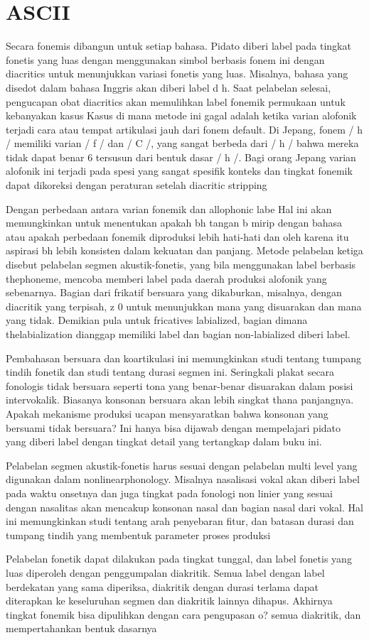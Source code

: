 \section{ASCII}
Secara fonemis dibangun untuk setiap bahasa.
Pidato diberi label pada tingkat fonetis yang luas dengan menggunakan simbol berbasis fonem ini dengan diacritics
untuk menunjukkan variasi fonetis yang luas. Misalnya, bahasa yang disedot dalam bahasa Inggris akan diberi label d h.
Saat pelabelan selesai, pengucapan obat diacritics akan memulihkan label fonemik permukaan
untuk kebanyakan kasus Kasus di mana metode ini gagal adalah ketika varian alofonik terjadi
cara atau tempat artikulasi jauh dari fonem default. Di Jepang, fonem / h /
memiliki varian / f / dan / C /, yang sangat berbeda dari / h / bahwa mereka tidak dapat benar 6
tersusun dari bentuk dasar / h /. Bagi orang Jepang varian alofonik ini terjadi pada spesi yang sangat spesifik
konteks dan tingkat fonemik dapat dikoreksi dengan peraturan setelah diacritic stripping

Dengan perbedaan antara varian fonemik dan allophonic labe Hal ini akan memungkinkan untuk menentukan apakah bh tangan b mirip dengan bahasa atau apakah perbedaan fonemik diproduksi lebih hati-hati dan oleh karena itu aspirasi bh lebih konsisten dalam kekuatan dan panjang. Metode pelabelan ketiga disebut pelabelan segmen akustik-fonetis, yang bila menggunakan label berbasis thephoneme, mencoba memberi label pada daerah produksi alofonik yang sebenarnya. Bagian dari frikatif bersuara yang dikaburkan, misalnya, dengan diacritik yang terpisah, z 0 untuk menunjukkan mana yang disuarakan dan mana yang tidak. Demikian pula untuk fricatives labialized, bagian dimana thelabialization dianggap memiliki label dan bagian non-labialized diberi label. 

Pembahasan bersuara dan koartikulasi ini memungkinkan studi tentang tumpang tindih fonetik dan studi tentang durasi segmen ini. Seringkali plakat secara fonologis tidak bersuara seperti tona yang benar-benar disuarakan dalam posisi intervokalik. Biasanya konsonan bersuara akan lebih singkat thana panjangnya. Apakah mekanisme produksi ucapan mensyaratkan bahwa konsonan yang bersuami tidak bersuara? Ini hanya bisa dijawab dengan mempelajari pidato yang diberi label dengan tingkat detail yang tertangkap dalam buku ini. 

Pelabelan segmen akustik-fonetis harus sesuai dengan pelabelan multi level yang digunakan dalam nonlinearphonology. Misalnya nasalisasi vokal akan diberi label pada waktu onsetnya dan juga tingkat pada fonologi non linier yang sesuai dengan nasalitas akan mencakup konsonan nasal dan bagian nasal dari vokal. Hal ini memungkinkan studi tentang arah penyebaran fitur, dan batasan durasi dan tumpang tindih yang membentuk parameter proses produksi 	

Pelabelan fonetik dapat dilakukan pada tingkat tunggal, dan label fonetis yang luas diperoleh dengan penggumpalan diakritik. Semua label dengan label berdekatan yang sama diperiksa, diakritik dengan durasi terlama dapat diterapkan ke keseluruhan segmen dan diakritik lainnya dihapus. Akhirnya tingkat fonemik bisa dipulihkan dengan cara pengupasan o? semua diakritik, dan mempertahankan bentuk dasarnya